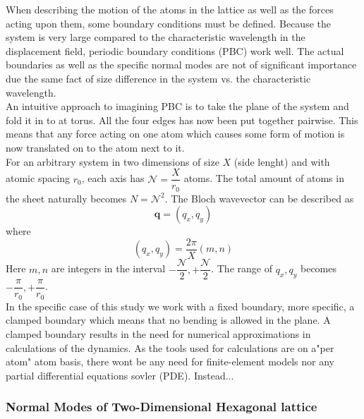 When describing the motion of the atoms in the lattice as well as the forces acting upon them, some boundary conditions must be defined. Because the system is very large compared to the characteristic wavelength in the displacement field, periodic boundary conditions (PBC) work well. The actual boundaries as well as the specific normal modes are not of significant importance due the same fact of size difference in the system vs. the characteristic wavelength. \\ 
An intuitive approach to imagining PBC is to take the plane of the system and fold it in to at torus. All the four edges has now been put together pairwise. This means that any force acting on one atom which causes some form of motion is now translated on to the atom next to it.\\
For an arbitrary system in two dimensions of size $X$ (side lenght) and with atomic spacing $r_{0}$, each axis has $\mathcal{N}=\dfrac{X}{r_{0}}$ atoms. The total amount of atoms in the sheet naturally becomes $N=\mathcal{N}^{2}$. The Bloch wavevector can be described as 
\begin{equation}
     \mathbf{q}=(q_{x},q_{y})
\end{equation}
where 
\begin{equation}
     (q_{x},q_{y})=\dfrac{2\pi}{X}(m,n)
\end{equation}
Here $m,n$ are integers in the interval $-\dfrac{\mathcal{N}}{2}, +\dfrac{\mathcal{N}}{2}$. The range of $q_{x},q_{y}$ becomes $-\dfrac{\pi}{r_{0}},+\dfrac{\pi}{r_{0}}$.\\
In the specific case of this study we work with a fixed boundary, more specific, a clamped boundary which means that no bending is allowed in the plane. A clamped boundary results in the need for numerical approximations in calculations of the dynamics. As the tools used for calculations are on a"per atom" atom basis, there wont be any need for finite-element models nor any partial differential equations sovler (PDE). Instead... 

\subsubsection{Normal Modes of Two-Dimensional Hexagonal lattice}


 